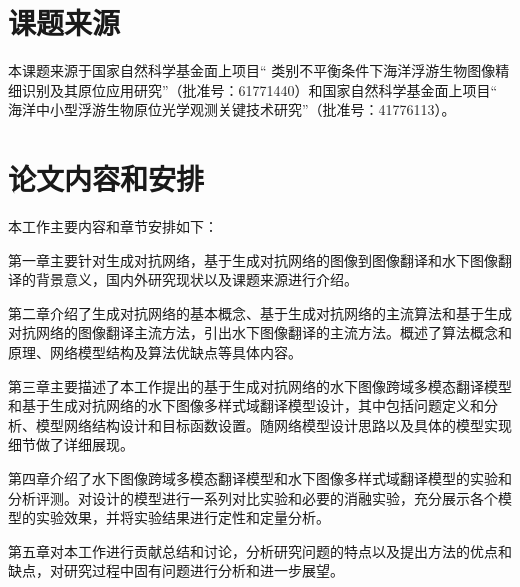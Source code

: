 \section{课题来源}
本课题来源于国家自然科学基金面上项目“ 类别不平衡条件下海洋浮游生物图像精细识别及其原位应用研究”（批准号：61771440）和国家自然科学基金面上项目“ 海洋中小型浮游生物原位光学观测关键技术研究”（批准号：41776113）。


\section{论文内容和安排}
本工作主要内容和章节安排如下：

第一章主要针对生成对抗网络，基于生成对抗网络的图像到图像翻译和水下图像翻译的背景意义，国内外研究现状以及课题来源进行介绍。

第二章介绍了生成对抗网络的基本概念、基于生成对抗网络的主流算法和基于生成对抗网络的图像翻译主流方法，引出水下图像翻译的主流方法。概述了算法概念和原理、网络模型结构及算法优缺点等具体内容。

第三章主要描述了本工作提出的基于生成对抗网络的水下图像跨域多模态翻译模型和基于生成对抗网络的水下图像多样式域翻译模型设计，其中包括问题定义和分析、模型网络结构设计和目标函数设置。随网络模型设计思路以及具体的模型实现细节做了详细展现。

第四章介绍了水下图像跨域多模态翻译模型和水下图像多样式域翻译模型的实验和分析评测。对设计的模型进行一系列对比实验和必要的消融实验，充分展示各个模型的实验效果，并将实验结果进行定性和定量分析。

第五章对本工作进行贡献总结和讨论，分析研究问题的特点以及提出方法的优点和缺点，对研究过程中固有问题进行分析和进一步展望。

